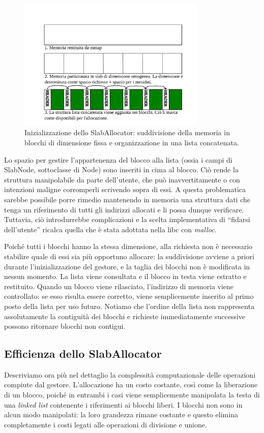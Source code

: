 \begin{figure}[H]
    \centering
    \includegraphics[width=0.8\textwidth]{images/slab/slab_allocator_init.pdf}
    \caption{Inizializzazione dello SlabAllocator: suddivisione della memoria in blocchi di dimensione fissa e organizzazione in una lista concatenata.}
    \label{fig:slab_allocator_init}
\end{figure}

Lo spazio per gestire l’appartenenza del blocco alla lista (ossia i campi di SlabNode, sottoclasse di Node) sono inseriti in cima al blocco. Ciò rende la struttura manipolabile da parte dell’utente, che può inavvertitamente o con intenzioni maligne corromperli scrivendo sopra di essi. A questa problematica sarebbe possibile porre rimedio mantenendo in memoria una struttura dati che tenga un riferimento di tutti gli indirizzi allocati e li possa dunque verificare. Tuttavia, ciò introdurrebbe complicazioni e la scelta implementativa di “fidarsi dell’utente” ricalca quella che è stata adottata nella libc con \textit{malloc}.

Poiché tutti i blocchi hanno la stessa dimensione, alla richiesta non è necessario stabilire quale di essi sia più opportuno allocare: la suddivisione avviene a priori durante l’inizializzazione del gestore, e la taglia dei blocchi non è modificata in nessun momento. La lista viene consultata e il blocco in testa viene estratto e restituito. Quando un blocco viene rilasciato, l’indirizzo di memoria viene controllato: se esso risulta essere corretto, viene semplicemente inserito al primo posto della lista per uso futuro. Notiamo che l’ordine della lista non rappresenta assolutamente la contiguità dei blocchi e richieste immediatamente successive possono ritornare blocchi non contigui.

\subsection*{Efficienza dello SlabAllocator}
Descriviamo ora più nel dettaglio la complessità computazionale delle operazioni compiute dal gestore. L’allocazione ha un costo costante, così come la liberazione di un blocco, poiché in entrambi i casi viene semplicemente manipolata la testa di una \textit{linked list} contenente i riferimenti ai blocchi liberi. I blocchi non sono in alcun modo manipolati: la loro grandezza rimane costante e questo elimina completamente i costi legati alle operazioni di divisione e unione.

